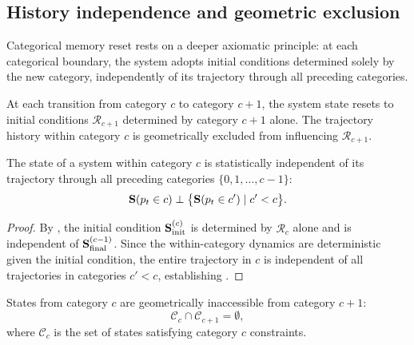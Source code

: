 \subsection{History independence and geometric exclusion}

Categorical memory reset rests on a deeper axiomatic principle: at each
categorical boundary, the system adopts initial conditions determined solely
by the new category, independently of its trajectory through all preceding
categories.

\begin{axiom}
\label{ax:ch07-memory-reset}
At each transition from category $c$ to category $c+1$, the system state
resets to initial conditions $\mathcal{R}_{c+1}$ determined by category
$c+1$ alone.  The trajectory history within category $c$ is geometrically
excluded from influencing $\mathcal{R}_{c+1}$.
\end{axiom}

\begin{theorem}
\label{thm:ch07-history-independence}
The state of a system within category $c$ is statistically independent of
its trajectory through all preceding categories $\{0,1,\ldots,c-1\}$:
\begin{equation}
  \mathbf{S}(p_t \in c) \perp \bigl\{\mathbf{S}(p_t \in c') \mid c' < c\bigr\}.
  \label{eq:ch07-history-independence}
\end{equation}
\end{theorem}

\begin{proof}
By , the initial condition
$\mathbf{S}_{\mathrm{init}}^{(c)}$ is determined by $\mathcal{R}_c$ alone and
is independent of $\mathbf{S}_{\mathrm{final}}^{(c-1)}$.  Since the within-category
dynamics are deterministic given the initial condition, the entire trajectory
in $c$ is independent of all trajectories in categories $c' < c$, establishing
.
\end{proof}

\begin{theorem}
\label{thm:ch07-geometric-exclusion}
States from category $c$ are geometrically inaccessible from category
$c+1$:
\begin{equation}
  \mathcal{C}_c \cap \mathcal{C}_{c+1} = \emptyset,
  \label{eq:ch07-geometric-exclusion}
\end{equation}
where $\mathcal{C}_c$ is the set of states satisfying category $c$
constraints.
\end{theorem}

